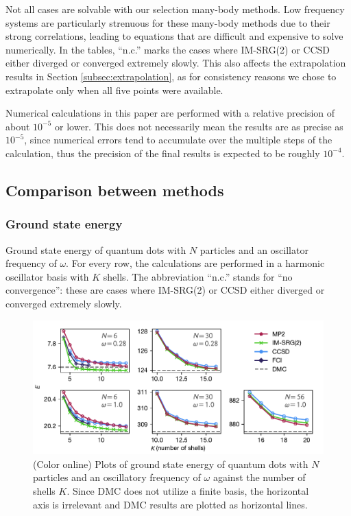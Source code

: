 Not all cases are solvable with our selection many-body methods.  Low frequency systems are particularly strenuous for these many-body methods due to their strong correlations, leading to equations that are difficult and expensive to solve numerically.  In the tables, ``n.c.'' marks the cases where IM-SRG(2) or CCSD either diverged or converged extremely slowly.  This also affects the extrapolation results in Section \ref{subsec:extrapolation}, as for consistency reasons we chose to extrapolate only when all five points were available.

Numerical calculations in this paper are performed with a relative precision of about $10^{-5}$ or lower.  This does not necessarily mean the results are as precise as $10^{-5}$, since numerical errors tend to accumulate over the multiple steps of the calculation, thus the precision of the final results is expected to be roughly $10^{-4}$.

\subsection{Comparison between methods}

\subsubsection{Ground state energy}

\begin{table}
  \centering
  \caption{Ground state energy of quantum dots with $N$ particles and an oscillator frequency of $\omega$.  For every row, the calculations are performed in a harmonic oscillator basis with $K$ shells.  The abbreviation ``n.c.'' stands for ``no convergence'': these are cases where IM-SRG(2) or CCSD either diverged or converged extremely slowly.}
  \label{tab:ground}
  
\end{table}

\begin{figure}
  \centering
  \includegraphics{fig-gs2.pdf}
  \caption{(Color online) Plots of ground state energy of quantum dots with $N$ particles and an oscillatory frequency of $\omega$ against the number of shells $K$.  Since DMC does not utilize a finite basis, the horizontal axis is irrelevant and DMC results are plotted as horizontal lines.}
  \label{fig:gs}
\end{figure}

